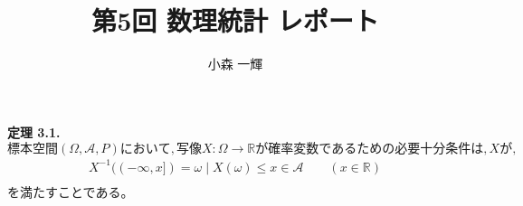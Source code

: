 \documentclass[dvipdfmx,10pt, a4j]{jarticle}
\title{第5回 数理統計 レポート}
\author{小森 一輝}
\theoremstyle{definition}
\begin{document}
    \maketitle

    \setcounter{section}{2}
    \noindent
    \textbf{定理 3.1.} $標本空間 (\Omega, \mathcal{A}, P)において, 写像X : \Omega \rightarrow \mathbb{R} が確率変数であるための必要十分条件は,X が,$
    \begin{align*}
        X^{-1}(( - \infty, x ]) = {\omega \mid X(\omega) \leq x} \in \mathcal{A} \qquad (x \in \mathbb{R})\\
    \end{align*}
    を満たすことである。\\
\end{document}
